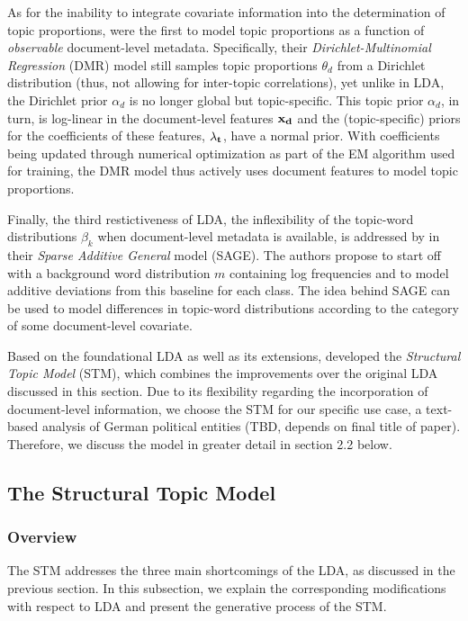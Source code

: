 As for the inability to integrate covariate information into the determination of topic proportions, \cite{mimno2011optimizing} were the first to model topic proportions as a function of \textit{observable} document-level metadata. Specifically, their \textit{Dirichlet-Multinomial Regression} (DMR) model still samples topic proportions $\theta_d$ from a Dirichlet distribution (thus, not allowing for inter-topic correlations), yet unlike in LDA, the Dirichlet prior $\alpha_d$ is no longer global but topic-specific. This topic prior $\alpha_d$, in turn, is log-linear in the document-level features $\bf{x_d}$ and the (topic-specific) priors for the coefficients of these features, $\bf{\lambda_t}$, have a normal prior. With coefficients being updated through numerical optimization as part of the EM algorithm used for training, the DMR model thus actively uses document features to model topic proportions. 

Finally, the third restictiveness of LDA, the inflexibility of the topic-word distributions $\beta_k$ when document-level metadata is available, is addressed by \cite{eisenstein2011sparse} in their \textit{Sparse Additive General} model (SAGE). The authors propose to start off with a background word distribution $m$ containing log frequencies and to model additive deviations from this baseline for each class. The idea behind SAGE can be used to model differences in topic-word distributions according to the category of some document-level covariate.

Based on the foundational LDA as well as its extensions, \cite{roberts2013structural} developed the \textit{Structural Topic Model} (STM), which combines the improvements over the original LDA discussed in this section. Due to its flexibility regarding the incorporation of document-level information, we choose the STM for our specific use case, a text-based analysis of German political entities (TBD, depends on final title of paper). Therefore, we discuss the model in greater detail in section 2.2 below.

\subsection{The Structural Topic Model}

\subsubsection*{Overview}

The STM addresses the three main shortcomings of the LDA, as discussed in the previous section. In this subsection, we explain the corresponding modifications with respect to LDA and present the generative process of the STM.

